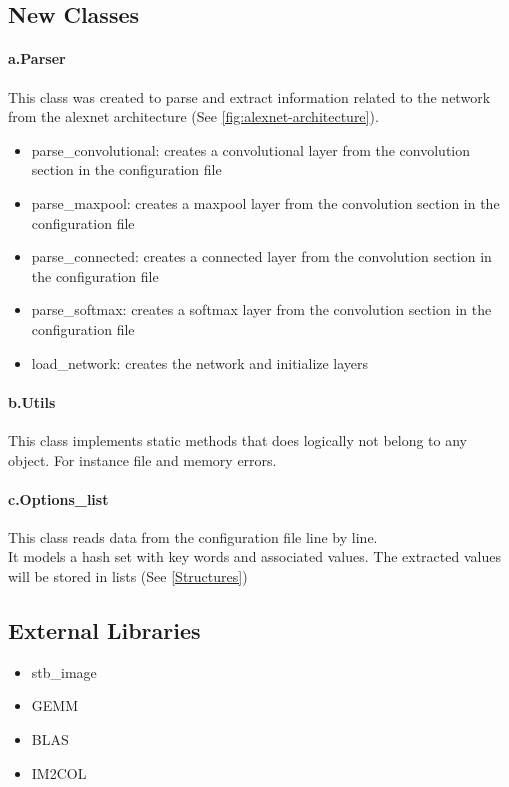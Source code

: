 \documentclass[parskip=full]{scrartcl}
\newcommand\tab[1][1cm]{\hspace*{#1}}
\begin{document}
	\subsection {New Classes}
		\paragraph{a.Parser} \label{Parser}
		\tab This class was created to parse and extract information related to the network from the alexnet architecture (See \ref{fig:alexnet-architecture}).
		\begin{itemize}
			\item parse\_convolutional: creates a convolutional layer from the convolution section in the configuration file
			\item parse\_maxpool: creates a maxpool layer from the convolution section in the configuration file
			\item parse\_connected: creates a connected layer from the convolution section in the configuration file
			\item parse\_softmax: creates a softmax layer from the convolution section in the configuration file
			\item load\_network: creates the network and initialize layers
		\end{itemize}
		
		\paragraph{b.Utils}
		\tab This class implements static methods that does logically not belong to any object. For instance file and memory errors. 
		
		\paragraph{c.Options\_list}
		\tab This class reads data from the configuration file line by line.\\
		It models a hash set with key words and associated values. The extracted values will be stored in lists (See \ref{Structures})
		
	\subsection {External Libraries} \label{External Libraries}
		\begin{itemize}
			\item stb\_image
			\item GEMM
			\item BLAS
			\item IM2COL
		\end{itemize}
		
\end{document}
